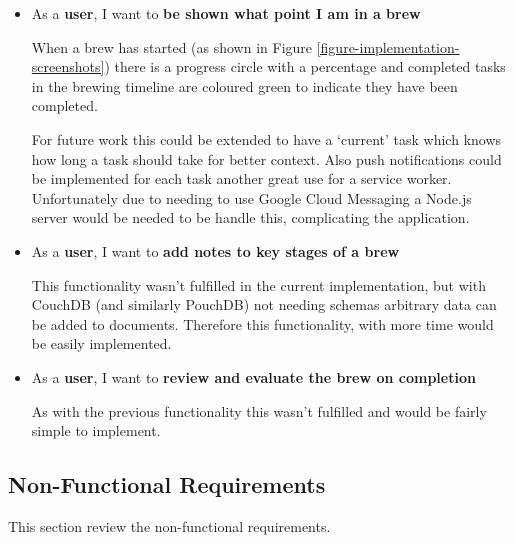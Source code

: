 \begin{itemize}
  \item As a \textbf{user}, I want to \textbf{be shown what point I am in a brew}

  When a brew has started (as shown in Figure \ref{figure-implementation-screenshots}) there is a progress circle with a percentage and completed tasks in the brewing timeline are coloured green to indicate they have been completed.

  For future work this could be extended to have a `current' task which knows how long a task should take for better context. Also push notifications could be implemented for each task another great use for a service worker. Unfortunately due to needing to use Google Cloud Messaging a Node.js server would be needed to be handle this, complicating the application. \cite{google_cloud_messaging}

  \item As a \textbf{user}, I want to \textbf{add notes to key stages of a brew}

  This functionality wasn't fulfilled in the current implementation, but with CouchDB (and similarly PouchDB) not needing schemas arbitrary data can be added to documents. Therefore this functionality, with more time would be easily implemented.

  \item As a \textbf{user}, I want to \textbf{review and evaluate the brew on completion}

  As with the previous functionality this wasn't fulfilled and would be fairly simple to implement.
\end{itemize}

\subsection{Non-Functional Requirements} \label{t-e--requirements--non-functional}

This section review the non-functional requirements.

